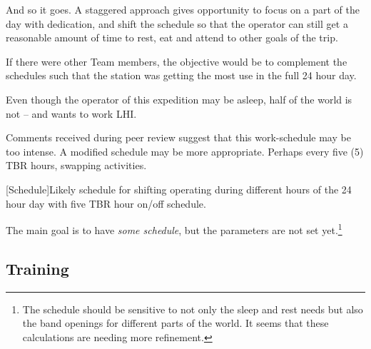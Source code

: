\documentclass[11pt]{article}
\begin{document}
And so it goes. A staggered approach gives opportunity to focus on
a part of the day with dedication, and shift the schedule so that
the operator can still get a reasonable amount of time to rest, eat
and attend to other goals of the trip.
\par
If there were other Team members, the objective would be to complement
the schedules such that the station was getting the most use in the full
24 hour day.
\par
Even though the operator of this expedition may be asleep, half of the world
is not -- and wants to work LHI.
\par
Comments received during peer review suggest that this work-schedule
may be too intense.  A modified schedule may be more appropriate. 
Perhaps every five (5) TBR hours, swapping activities.
\vskip2mm
\noindent%
\begin{minipage}{\linewidth}%
\captionsetup{width=0.8\linewidth}
[Schedule]{Likely schedule for shifting operating during
different hours of the 24 hour day with five TBR hour on/off schedule.}
\label{sked2}
\end{minipage}
\vskip3mm

The main goal is to have {\textit{some schedule}}, but the parameters
are not set yet.\footnote{ The schedule should be sensitive to not only 
the sleep and rest needs
but also the band openings for different parts of the world.  It seems
that these calculations are needing more refinement.}
\par

\subsection{Training}
\end{document}
